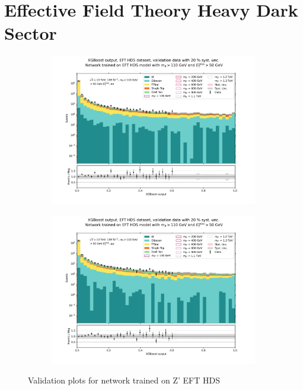 \documentclass[12pt, a4paper]{book}
\begin{document}
\section{Effective Field Theory Heavy Dark Sector}
\begin{figure}[!ht]
	\centering
	\begin{subfigure}[b]{0.49\textwidth}
      \centering
      \includegraphics[width=1\textwidth]{XGBoost/EFT_HDS/VAL_ee.pdf}
      \end{subfigure}
   \hfill
   \begin{subfigure}[b]{0.49\textwidth}
      \centering
      \includegraphics[width=1\textwidth]{XGBoost/EFT_HDS/VAL_uu.pdf}
      \end{subfigure}
   \caption{Validation plots for network trained on Z' EFT HDS}\label{fig:EFT_HDS_vals}
\end{figure}
\end{document}
